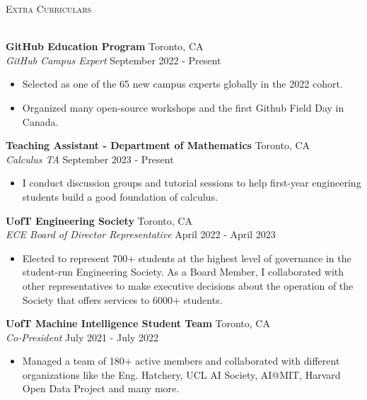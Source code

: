 \documentclass[a4paper]{article}
\newcommand{\lineunder} {
    \vspace*{-8pt} \\
    \hspace*{-18pt} \hrulefill \\
}
\newcommand{\header} [1] {
    {\hspace*{-18pt}\vspace*{6pt} \textsc{#1}}
    \vspace*{-6pt} \lineunder
}
\begin{document}
\header{Extra Curriculars}
\vspace{1mm}

\textbf{GitHub Education Program} \hfill Toronto, CA\\
\textit{GitHub Campus Expert} \hfill September 2022 - Present\\
\vspace{-1mm}
\begin{itemize} \itemsep 0.5pt
	\item Selected as one of the 65 new campus experts globally in the 2022 cohort.
    \item Organized many open-source workshops and the first Github Field Day in Canada.
\end{itemize}

\textbf{Teaching Assistant - Department of Mathematics} \hfill Toronto, CA\\
\textit{Calculus TA} \hfill September 2023 - Present\\
\vspace{-1mm}
\begin{itemize} \itemsep 0.5pt
	\item I conduct discussion groups and tutorial sessions to help first-year engineering students build a good foundation of calculus.
\end{itemize}

\textbf{UofT Engineering Society} \hfill Toronto, CA\\
\textit{ECE Board of Director Representative} \hfill April 2022 - April 2023\\
\vspace{-1mm}
\begin{itemize} \itemsep 0.5pt
	\item Elected to represent 700+ students at the highest level of governance in the student-run Engineering Society. As a Board Member, I collaborated with other representatives to make executive decisions about the operation of the Society that offers services to 6000+ students.
\end{itemize}

\textbf{UofT Machine Intelligence Student Team} \hfill Toronto, CA\\
\textit{Co-President} \hfill July 2021 - July 2022\\
\vspace{-1mm}
\begin{itemize} \itemsep 0.5pt
	\item Managed a team of 180+ active members and collaborated with different organizations like the Eng. Hatchery, UCL AI Society, AI@MIT, Harvard Open Data Project and many more.
\end{itemize}
\end{document}
